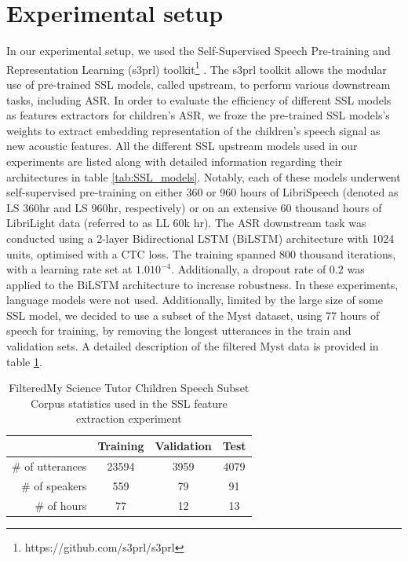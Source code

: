 \section{Experimental setup}
In our experimental setup, we used the Self-Supervised Speech Pre-training and Representation Learning (s3prl) toolkit\footnote{https://github.com/s3prl/s3prl} \cite{yang21c_interspeech}. The s3prl toolkit allows the modular use of pre-trained \ac{SSL} models, called upstream, to perform various downstream tasks, including \ac{ASR}. In order to evaluate the efficiency of different \ac{SSL} models as features extractors for children's \ac{ASR}, we froze the pre-trained \ac{SSL} models's weights to extract embedding representation of the children's speech signal as new acoustic features. All the different \ac{SSL} upstream models used in our experiments are listed along with detailed information regarding their architectures in table \ref{tab:SSL_models}. Notably, each of these models underwent self-supervised pre-training on either 360 or 960 hours of LibriSpeech \cite{librispeech} (denoted as LS 360hr and LS 960hr, respectively) or on an extensive 60 thousand hours of LibriLight data \cite{librilight} (referred to as LL 60k hr). 
The \ac{ASR} downstream task was conducted using a 2-layer Bidirectional \ac{LSTM} (BiLSTM) architecture with 1024 units, optimised with a \ac{CTC} loss. The training spanned 800 thousand iterations, with a learning rate set at $1.0\dot 10^{-4}$. Additionally, a dropout rate of $0.2$ was applied to the BiLSTM architecture to increase robustness. In these experiments, language models were not used. Additionally, limited by the large size of some \ac{SSL} model, we decided to use a subset of the Myst \cite{MyST} dataset, using 77 hours of speech for training, by removing the longest utterances in the train and validation sets. A detailed description of the filtered Myst data is provided in table \ref{tab:SSL_myst}.
\begin{table}[h]

    
    \begin{center}
    \begin{tabular}{r|ccc}
    \hline
     & Training & Validation     & Test   \\ \hline
    \# of utterances & 23594   & 3959    & 4079  \\ 
    \# of speakers & 559  & 79    & 91  \\ 
    \# of hours & 77   & 12    & 13  \\ \hline
    \end{tabular}
    \caption{FilteredMy Science Tutor Children Speech Subset Corpus statistics used in the \ac{SSL} feature extraction experiment}
    \label{tab:SSL_myst}
    \end{center}
    \end{table}


